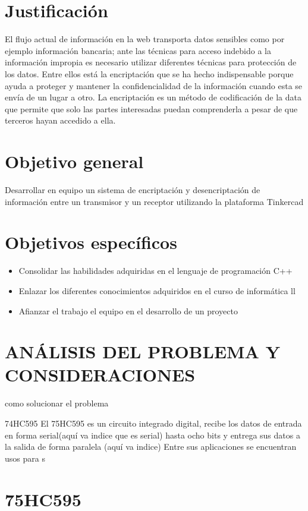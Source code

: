 \documentclass{article}
\begin{document}
\section{Justificación}
\label{contenido}
El flujo actual de información en la web transporta datos sensibles como por ejemplo información bancaria; ante las técnicas para acceso indebido a la información impropia es necesario utilizar diferentes técnicas para protección de los datos. Entre ellos está la encriptación que se ha hecho indispensable porque ayuda a proteger y mantener la confidencialidad de la información cuando esta se envía de un lugar a otro. La encriptación es un método de codificación de la data que permite que solo las partes interesadas puedan comprenderla a pesar de que terceros hayan accedido a ella.

\section{Objetivo general}
\label{contenido}
Desarrollar en equipo un sistema de encriptación y desencriptación de información entre un transmisor y un receptor utilizando la plataforma Tinkercad

\section{Objetivos específicos}
\label{contenido}
\begin{itemize}
\item Consolidar las habilidades adquiridas en el lenguaje de programación C++
\item Enlazar los diferentes conocimientos adquiridos en el curso de informática ll
\item Afianzar el trabajo el equipo en el desarrollo de un proyecto

\end{itemize}
\section{ANÁLISIS DEL PROBLEMA Y CONSIDERACIONES}
como solucionar el problema

74HC595
El 75HC595 es un circuito integrado digital, recibe los datos de entrada en forma serial(aquí va indice que es serial) hasta ocho bits y entrega sus datos a la salida de forma paralela (aquí va indice)
Entre sus aplicaciones se encuentran usos para s

\section{75HC595}
\end{document}
